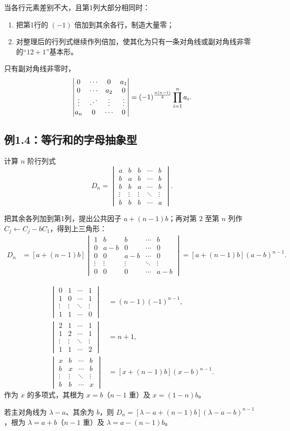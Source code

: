 \documentclass[UTF8,zihao=5,fontset=mac]{ctexart}
\newcommand{\dmat}[1]{\begin{vmatrix}#1\end{vmatrix}}
\begin{document}
\begin{summarybox}[分析与方法总结]
当各行元素差别不大，且第1列大部分相同时：
\begin{enumerate}
  \item 把第1行的 $(-1)$ 倍加到其余各行，制造大量零；
  \item 对整理后的行列式继续作列倍加，使其化为只有一条对角线或副对角线非零的“$12+1$”基本形。
\end{enumerate}
只有副对角线非零时，
\[
\dmat{0&\cdots&0&a_1\\0&\cdots&a_2&0\\\vdots&\reflectbox{$\ddots$}&\vdots&\vdots\\a_n&0&\cdots&0}
=(-1)^{\frac{n(n-1)}2}\prod_{i=1}^{n}a_i.
\]
\end{summarybox}

\subsection{例1.4：等行和的字母抽象型}
\begin{problembox}[题目]
计算 $n$ 阶行列式
\[
D_n=\dmat{
a&b&b&\cdots&b\\
b&a&b&\cdots&b\\
b&b&a&\cdots&b\\
\vdots&\vdots&\vdots&\ddots&\vdots\\
b&b&b&\cdots&a}.
\]
\end{problembox}

把其余各列加到第1列，提出公共因子 $a+(n-1)b$；再对第 $2$ 至第 $n$ 列作 $C_j\leftarrow C_j-bC_1$，得到上三角形：
\begin{align*}
D_n
&=[a+(n-1)b]
\dmat{1&b&b&\cdots&b\\0&a-b&0&\cdots&0\\0&0&a-b&\cdots&0\\\vdots&\vdots&\vdots&\ddots&\vdots\\0&0&0&\cdots&a-b}
=\boxed{[a+(n-1)b](a-b)^{n-1}}.
\end{align*}

\begin{summarybox}[必背变式]
\begin{align*}
\dmat{0&1&\cdots&1\\1&0&\cdots&1\\\vdots&\vdots&\ddots&\vdots\\1&1&\cdots&0}
&=(n-1)(-1)^{n-1},\\[2mm]
\dmat{2&1&\cdots&1\\1&2&\cdots&1\\\vdots&\vdots&\ddots&\vdots\\1&1&\cdots&2}
&=n+1,\\[2mm]
\dmat{x&b&\cdots&b\\b&x&\cdots&b\\\vdots&\vdots&\ddots&\vdots\\b&b&\cdots&x}
&=[x+(n-1)b](x-b)^{n-1}.
\end{align*}
作为 $x$ 的多项式，其根为 $x=b$（$n-1$ 重）及 $x=(1-n)b$。

若主对角线为 $\lambda-a$、其余为 $b$，则 $D_n=[\lambda-a+(n-1)b](\lambda-a-b)^{n-1}$，根为 $\lambda=a+b$（$n-1$ 重）及 $\lambda=a-(n-1)b$。
\end{summarybox}
\end{document}
